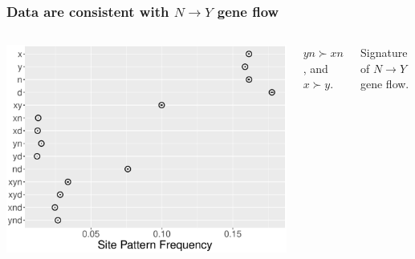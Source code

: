 \documentclass[pdftex,12pt]{beamer}
\begin{document}
\begin{frame}
  \frametitle{Data are consistent with $N{\rightarrow}Y$ gene flow}
  \begin{columns}
    \includegraphics[width=\linewidth]{xynd-frq.pdf}
    \raggedleft

    $yn \succ xn$, and $x \succ y$.

    \bigskip

    Signature of $N{\rightarrow}Y$ gene flow.
    
  \end{columns}
\end{frame}
\end{document}

